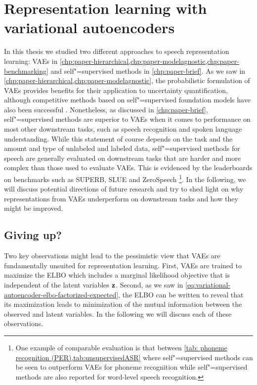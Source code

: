 \section{Representation learning with variational autoencoders}
%
In this thesis we studied two different approaches to speech representation learning: VAEs in \cref{chp:paper-hierarchical,chp:paper-modelagnostic,chp:paper-benchmarking} and self"=supervised methods in \cref{chp:paper-brief}. 
As we saw in \cref{chp:paper-hierarchical,chp:paper-modelagnostic}, the probabilistic formulation of VAEs provides benefits for their application to uncertainty quantification, although competitive methods based on self"=supervised foundation models have also been successful \parencite{xiao_we_2021,hendrycks_using_2019,bergman_classificationbased_2020}. 
Nonetheless, as discussed in \cref{chp:paper-brief}, self"=supervised methods are superior to VAEs when it comes to performance on most other downstream tasks, such as speech recognition and spoken language understanding. 
While this statement of course depends on the task and the amount and type of unlabeled and labeled data, self"=supervised methods for speech are generally evaluated on downstream tasks that are harder and more complex than those used to evaluate VAEs. This is evidenced by the leaderboards on benchmarks such as SUPERB, SLUE and ZeroSpeech \parencite{yang_superb_2021,shon_slue_2021,dunbar_zero_2021} \footnote{One example of comparable evaluation is that between \cref{tab: phoneme recognition (PER),tab:unsupervisedASR} where self"=supervised methods can be seen to outperform VAEs for phoneme recognition while self"=supervised methods are also reported for word-level speech recognition.}.
In the following, we will discuss potential directions of future research and try to shed light on why representations from VAEs underperform on downstream tasks and how they might be improved.


\subsection{Giving up?}

Two key observations might lead to the pessimistic view that VAEs are fundamentally unsuited for representation learning. 
First, VAEs are trained to maximize the ELBO which includes a marginal likelihood objective that is independent of the latent variables ${\mathbf{z}}$. Second, as we saw in \cref{eq:variational-autoencoder-elbo-factorized-expected}, the ELBO can be written to reveal that its maximization leads to minimization of the mutual information between the observed and latent variables. In the following we will discuss each of these observations.


